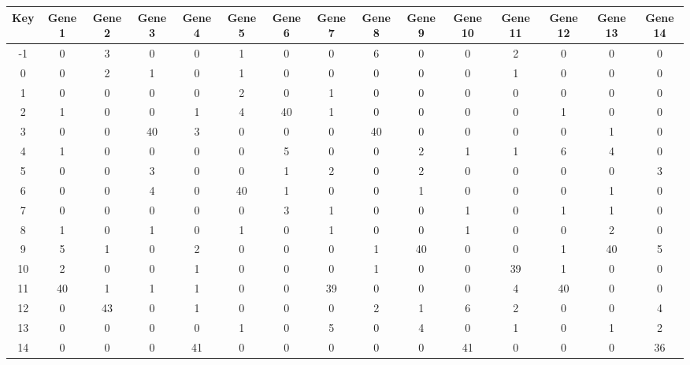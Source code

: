 \begin{tabular}{|c|c|c|c|c|c|c|c|c|c|c|c|c|c|c|}
\hline
Key & Gene 1 & Gene 2 & Gene 3 & Gene 4 & Gene 5 & Gene 6 & Gene 7 & Gene 8 & Gene 9 & Gene 10 & Gene 11 & Gene 12 & Gene 13 & Gene 14 \\
\hline
-1 & 0 & 3 & 0 & 0 & 1 & 0 & 0 & 6 & 0 & 0 & 2 & 0 & 0 & 0 \\
0 & 0 & 2 & 1 & 0 & 1 & 0 & 0 & 0 & 0 & 0 & 1 & 0 & 0 & 0 \\
1 & 0 & 0 & 0 & 0 & 2 & 0 & 1 & 0 & 0 & 0 & 0 & 0 & 0 & 0 \\
2 & 1 & 0 & 0 & 1 & 4 & 40 & 1 & 0 & 0 & 0 & 0 & 1 & 0 & 0 \\
3 & 0 & 0 & 40 & 3 & 0 & 0 & 0 & 40 & 0 & 0 & 0 & 0 & 1 & 0 \\
4 & 1 & 0 & 0 & 0 & 0 & 5 & 0 & 0 & 2 & 1 & 1 & 6 & 4 & 0 \\
5 & 0 & 0 & 3 & 0 & 0 & 1 & 2 & 0 & 2 & 0 & 0 & 0 & 0 & 3 \\
6 & 0 & 0 & 4 & 0 & 40 & 1 & 0 & 0 & 1 & 0 & 0 & 0 & 1 & 0 \\
7 & 0 & 0 & 0 & 0 & 0 & 3 & 1 & 0 & 0 & 1 & 0 & 1 & 1 & 0 \\
8 & 1 & 0 & 1 & 0 & 1 & 0 & 1 & 0 & 0 & 1 & 0 & 0 & 2 & 0 \\
9 & 5 & 1 & 0 & 2 & 0 & 0 & 0 & 1 & 40 & 0 & 0 & 1 & 40 & 5 \\
10 & 2 & 0 & 0 & 1 & 0 & 0 & 0 & 1 & 0 & 0 & 39 & 1 & 0 & 0 \\
11 & 40 & 1 & 1 & 1 & 0 & 0 & 39 & 0 & 0 & 0 & 4 & 40 & 0 & 0 \\
12 & 0 & 43 & 0 & 1 & 0 & 0 & 0 & 2 & 1 & 6 & 2 & 0 & 0 & 4 \\
13 & 0 & 0 & 0 & 0 & 1 & 0 & 5 & 0 & 4 & 0 & 1 & 0 & 1 & 2 \\
14 & 0 & 0 & 0 & 41 & 0 & 0 & 0 & 0 & 0 & 41 & 0 & 0 & 0 & 36 \\
\hline
\end{tabular}